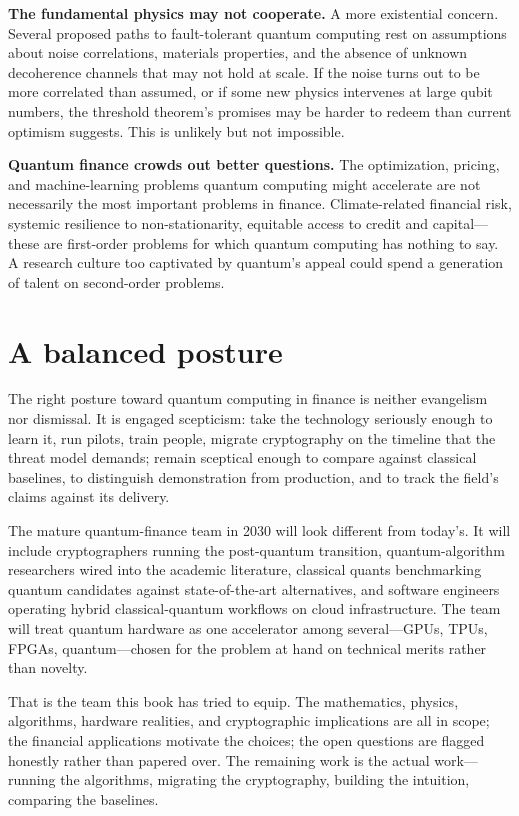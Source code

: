 \textbf{The fundamental physics may not cooperate.} A more existential concern. Several proposed paths to fault-tolerant quantum computing rest on assumptions about noise correlations, materials properties, and the absence of unknown decoherence channels that may not hold at scale. If the noise turns out to be more correlated than assumed, or if some new physics intervenes at large qubit numbers, the threshold theorem's promises may be harder to redeem than current optimism suggests. This is unlikely but not impossible.

\textbf{Quantum finance crowds out better questions.} The optimization, pricing, and machine-learning problems quantum computing might accelerate are not necessarily the most important problems in finance. Climate-related financial risk, systemic resilience to non-stationarity, equitable access to credit and capital---these are first-order problems for which quantum computing has nothing to say. A research culture too captivated by quantum's appeal could spend a generation of talent on second-order problems.

\section{A balanced posture}

The right posture toward quantum computing in finance is neither evangelism nor dismissal. It is engaged scepticism: take the technology seriously enough to learn it, run pilots, train people, migrate cryptography on the timeline that the threat model demands; remain sceptical enough to compare against classical baselines, to distinguish demonstration from production, and to track the field's claims against its delivery.

The mature quantum-finance team in 2030 will look different from today's. It will include cryptographers running the post-quantum transition, quantum-algorithm researchers wired into the academic literature, classical quants benchmarking quantum candidates against state-of-the-art alternatives, and software engineers operating hybrid classical-quantum workflows on cloud infrastructure. The team will treat quantum hardware as one accelerator among several---GPUs, TPUs, FPGAs, quantum---chosen for the problem at hand on technical merits rather than novelty.

That is the team this book has tried to equip. The mathematics, physics, algorithms, hardware realities, and cryptographic implications are all in scope; the financial applications motivate the choices; the open questions are flagged honestly rather than papered over. The remaining work is the actual work---running the algorithms, migrating the cryptography, building the intuition, comparing the baselines.

